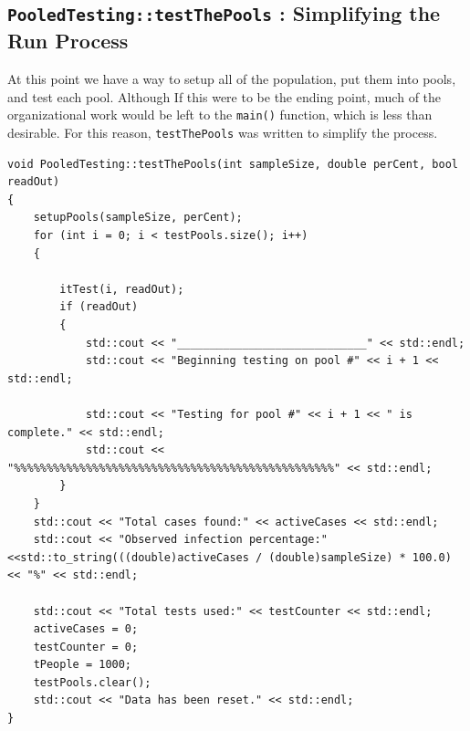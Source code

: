 \documentclass[letterpaper, 10pt]{article}
\begin{document}
\subsection{\texttt{PooledTesting::testThePools} : Simplifying the Run Process}

At this point we have a way to setup all of the population, put them into pools, and test each pool. Although If this were to be the ending point, much of the organizational work would be left to the \texttt{main()} function, which is less than desirable. For this reason, \texttt{testThePools} was written to simplify the process.

 \begin{addmargin}[-5em]{1em}
\begin{small}
\begin{verbatim}
void PooledTesting::testThePools(int sampleSize, double perCent, bool readOut)
{
    setupPools(sampleSize, perCent);
    for (int i = 0; i < testPools.size(); i++)
    {
        
        itTest(i, readOut);
        if (readOut)
        {
            std::cout << "_____________________________" << std::endl;
            std::cout << "Beginning testing on pool #" << i + 1 << std::endl;

            std::cout << "Testing for pool #" << i + 1 << " is complete." << std::endl;
            std::cout << "%%%%%%%%%%%%%%%%%%%%%%%%%%%%%%%%%%%%%%%%%%%%%%%%%" << std::endl;
        }
    }
    std::cout << "Total cases found:" << activeCases << std::endl;
    std::cout << "Observed infection percentage:" <<std::to_string(((double)activeCases / (double)sampleSize) * 100.0) << "%" << std::endl;
    
    std::cout << "Total tests used:" << testCounter << std::endl;
    activeCases = 0;
    testCounter = 0;
    tPeople = 1000;
    testPools.clear();
    std::cout << "Data has been reset." << std::endl;
}
\end{verbatim}
\end{small}
\end{addmargin}
\end{document}
